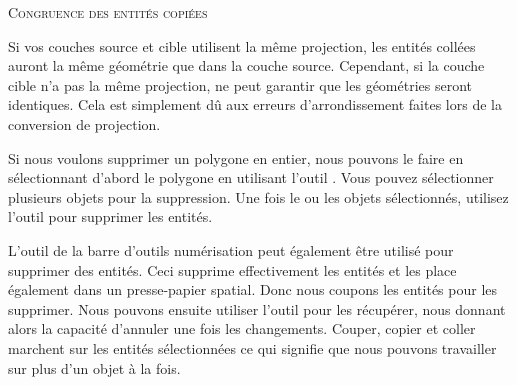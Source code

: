 \begin{Tip}[ht]\caption{\textsc{Congruence des entités copiées}}
Si vos couches source et cible utilisent la même projection, les entités collées auront la même géométrie que dans la couche source. Cependant, si la couche cible n'a pas la même projection, \qg ne peut garantir que les géométries seront identiques. Cela est simplement dû aux erreurs d'arrondissement faites lors de la conversion de projection.
\end{Tip}


Si nous voulons supprimer un polygone en entier, nous pouvons le faire en sélectionnant d'abord le polygone en utilisant l'outil . Vous pouvez sélectionner plusieurs objets pour la suppression. Une fois le ou les objets sélectionnés, utilisez l'outil  pour supprimer les entités.

L'outil  de la barre d'outils numérisation peut également être utilisé pour supprimer des entités. Ceci supprime effectivement les entités et les place également dans un presse-papier spatial. Donc nous coupons les entités pour les supprimer. Nous pouvons ensuite utiliser l'outil  pour les récupérer, nous donnant alors la capacité d'annuler une fois les changements. Couper, copier et coller marchent sur les entités sélectionnées ce qui signifie que nous pouvons travailler sur plus d'un objet à la fois.

